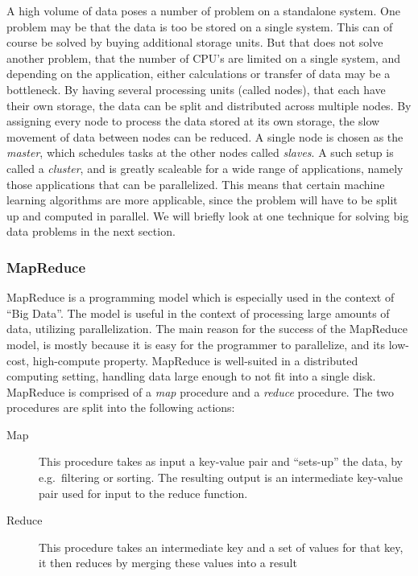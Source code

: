 A high volume of data poses a number of problem on a standalone system. One problem may be that the data is too be stored on a single system.
This can of course be solved by buying additional storage units. But that does not solve another problem, that the number of CPU's are limited on a single system, and depending on the application, either calculations or transfer of data may be a bottleneck.
By having several processing units (called nodes), that each have their own storage, the data can be split and distributed across multiple nodes. By assigning every node to process the data stored at its own storage, the slow movement of data between nodes can be reduced.
A single node is chosen as the \textit{master}, which schedules tasks at the other nodes called \textit{slaves}. A such setup is called a \textit{cluster}, and is greatly scaleable for a wide range of applications, namely those applications that can be parallelized.
This means that certain machine learning algorithms are more applicable, since the problem will have to be split up and computed in parallel. We will briefly look at one technique for solving big data problems in the next section.

\subsubsection{MapReduce} %
\label{sec:mapreduce_programming_model}
MapReduce is a programming model which is especially used in the context of ``Big Data''. The model is useful in the context of processing large amounts of data, utilizing parallelization. The main reason for the success of the MapReduce model, is mostly because it is easy for the programmer to parallelize, and its low-cost, high-compute property. MapReduce is well-suited in a distributed computing setting, handling data large enough to not fit into a single disk.
MapReduce is comprised of a \emph{map} procedure and a \emph{reduce} procedure. The two procedures are split into the following actions:

\begin{description}
    \item[Map] This procedure takes as input a key-value pair and ``sets-up'' the data, by e.g.\ filtering or sorting. The resulting output is an intermediate key-value pair used for input to the reduce function.
    \item[Reduce] This procedure takes an intermediate key and a set of values for that key, it then reduces by merging these values into a result
\end{description}









